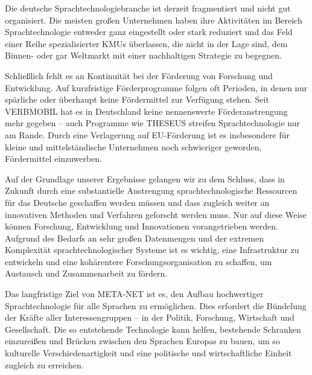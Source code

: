 \begin{multicols}{2}
Die deutsche Sprachtechnologiebranche ist derzeit fragmentiert und nicht gut organisiert. Die meisten großen Unternehmen haben ihre Aktivitäten im Bereich Sprachtechnologie entweder ganz eingestellt oder stark reduziert und das Feld einer Reihe spezialisierter KMUs überlassen, die nicht in der Lage sind, dem Binnen- oder gar Weltmarkt mit einer nachhaltigen Strategie zu begegnen. 

Schließlich fehlt es an Kontinuität bei der Förderung von Forschung und Entwicklung. Auf kurzfristige Förderprogramme folgen oft Perioden, in denen nur spärliche oder überhaupt keine Fördermittel zur Verfügung stehen. Seit VERBMOBIL hat es in Deutschland keine nennenswerte Förderanstrengung mehr gegeben -- auch Programme wie THESEUS streifen Sprachtechnologie nur am Rande. Durch eine Verlagerung auf EU-Förderung ist es insbesondere für kleine und mittelständische Unternehmen noch schwieriger geworden, Fördermittel einzuwerben.

Auf der Grundlage unserer Ergebnisse gelangen wir zu dem Schluss, dass in Zukunft durch eine substantielle Anstrengung sprachtechnologische Ressourcen für das Deutsche geschaffen werden müssen und dass zugleich weiter an innovativen Methoden und Verfahren geforscht werden muss. Nur auf diese Weise können Forschung, Entwicklung und Innovationen vorangetrieben werden. Aufgrund des Bedarfs an sehr großen Datenmengen und der extremen Komplexität sprachtechnologischer Systeme ist es wichtig, eine Infrastruktur zu entwickeln und eine kohärentere Forschungsorganisation zu schaffen, um Austausch und Zusammenarbeit zu fördern.

Das langfristige Ziel von META-NET ist es, den Aufbau hochwertiger Sprachtechnologie für alle Sprachen zu ermöglichen. Dies erfordert die Bündelung der Kräfte aller Interessengruppen -- in der Politik, Forschung, Wirtschaft und Gesellschaft. Die so entstehende Technologie kann helfen, bestehende Schranken einzureißen und Brücken zwischen den Sprachen Europas zu bauen, um so kulturelle Verschiedenartigkeit und eine politische und wirtschaftliche Einheit zugleich zu erreichen. 
\end{multicols}

\clearpage

